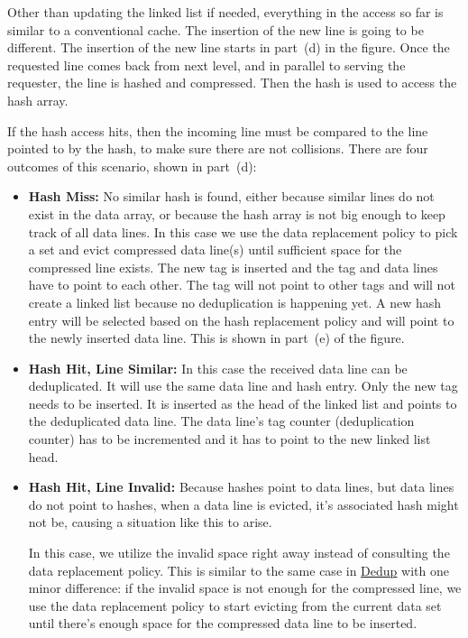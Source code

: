 Other than updating the linked list if needed, everything in the access so far is similar to a conventional cache. The insertion of the new line is going to be different. The insertion of the new line starts in part~(d) in the figure. Once the requested line comes back from next level, and in parallel to serving the requester, the line is hashed and compressed. Then the hash is used to access the hash array.\par
If the hash access hits, then the incoming line must be compared to the line pointed to by the hash, to make sure there are not collisions. There are four outcomes of this scenario, shown in part~(d):
\begin{itemize}
    \item \textbf{Hash Miss:} No similar hash is found, either because similar lines do not exist in the data array, or because the hash array is not big enough to keep track of all data lines. In this case we use the data replacement policy to pick a set and evict compressed data line(s) until sufficient space for the compressed line exists. The new tag is inserted and the tag and data lines have to point to each other. The tag will not point to other tags and will not create a linked list because no deduplication is happening yet. A new hash entry will be selected based on the hash replacement policy and will point to the newly inserted data line. This is shown in part~(e) of the figure.
    \item \textbf{Hash Hit, Line Similar:} In this case the received data line can be deduplicated. It will use the same data line and hash entry. Only the new tag needs to be inserted. It is inserted as the head of the linked list and points to the deduplicated data line. The data line's tag counter (deduplication counter) has to be incremented and it has to point to the new linked list head.
    \item \textbf{Hash Hit, Line Invalid:}\label{itm:override} Because hashes point to data lines, but data lines do not point to hashes, when a data line is evicted, it's associated hash might not be, causing a situation like this to arise.\par
        In this case, we utilize the invalid space right away instead of consulting the data replacement policy. This is similar to the same case in \hyperref[ssec:DedupOperations]{Dedup} with one minor difference: if the invalid space is not enough for the compressed line, we use the data replacement policy to start evicting from the current data set until there's enough space for the compressed data line to be inserted.\par

\end{itemize}
